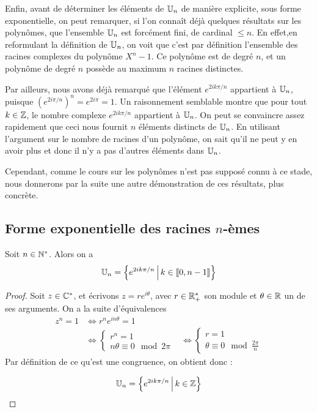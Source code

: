 Enfin, avant de déterminer les éléments de $\mathbb{U}_n$ de manière explicite, sous forme exponentielle, on peut remarquer, si l'on connaît déjà quelques résultats sur les polynômes, que l'ensemble $\mathbb{U}_n$ est forcément fini, de cardinal $\leq n$. En effet,en reformulant la définition de $\mathbb{U}_n$, on voit que c'est par définition l'ensemble des racines complexes du polynôme $X^n-1$. Ce polynôme est de degré $n$, et un polynôme de degré $n$ possède au maximum $n$ racines distinctes.

Par ailleurs, nous avons déjà remarqué que l'élément $e^{2ik\pi/n}$ appartient à $\mathbb{U}_n$, puisque $\left(e^{2i\pi/n}\right)^n=e^{2i\pi}=1$. Un raisonnement semblable montre que pour tout $k\in\mathbb{Z}$, le nombre complexe $e^{2ik\pi/n}$ appartient à $\mathbb{U}_n$. On peut se convaincre assez rapidement que ceci nous fournit $n$ éléments distincts de $\mathbb{U}_n$. En utilisant l'argument sur le nombre de racines d'un polynôme, on sait qu'il ne peut y en avoir plus et donc il n'y a pas d'autres éléments dans $\mathbb{U}_n$.

Cependant, comme le cours sur les polynômes n'est pas supposé connu à ce stade, nous donnerons par la suite une autre démonstration de ces résultats, plus concrète.

\subsection{Forme exponentielle des racines $n$-èmes}


\begin{proposition}
\label{prop:gen_U_n}
Soit $n\in\mathbb{N}^*$. Alors on a
\[ \U_n = \ensemble{e^{2ik\pi/n}}{k\in \llbracket 0,n-1\rrbracket}\]
\end{proposition}
\begin{proof}
Soit $z\in\mathbb{C}^*$, et écrivons $z=re^{i\theta}$, avec $r\in\mathbb{R}_+^*$ son module et $\theta\in\mathbb{R}$ un de ses arguments. On a la suite d'équivalences
\begin{align*}
z^n=1 &\iff r^ne^{in\theta}=1\\
&\iff \begin{cases}r^n=1\\n\theta \equiv 0\mod 2\pi\end{cases}
&\iff \begin{cases}r=1\\\theta \equiv 0\mod \frac{2\pi}{n}\end{cases}
\end{align*}
Par définition de ce qu'est une congruence, on obtient donc :

\[ \U_n = \ensemble{e^{2ik\pi/n}}{k\in \Z}\]
\end{proof}

